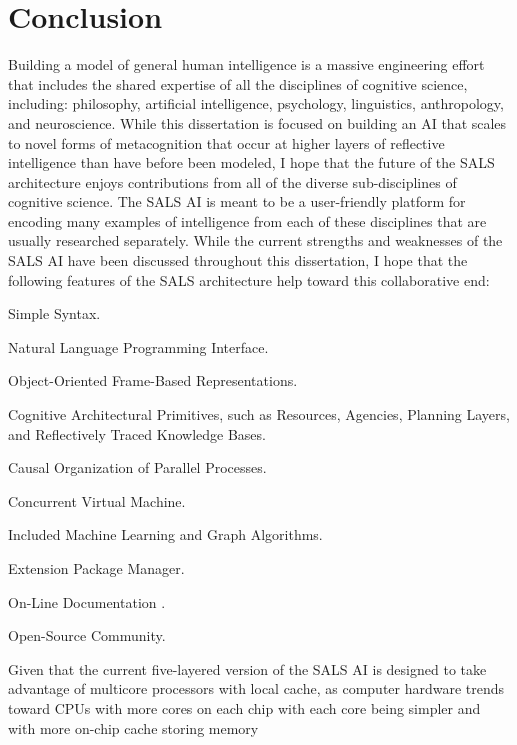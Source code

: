\chapter{Conclusion}
\label{chapter:conclusion}

Building a model of general human intelligence is a massive
engineering effort that includes the shared expertise of all the
disciplines of cognitive science, including: philosophy, artificial
intelligence, psychology, linguistics, anthropology, and neuroscience.
While this dissertation is focused on building an AI that scales to
novel forms of metacognition that occur at higher layers of reflective
intelligence than have before been modeled, I hope that the future of
the SALS architecture enjoys contributions from all of the diverse
sub-disciplines of cognitive science.  The SALS AI is meant to be a
user-friendly platform for encoding many examples of intelligence from
each of these disciplines that are usually researched separately.
While the current strengths and weaknesses of the SALS AI have been
discussed throughout this dissertation, I hope that the following
features of the SALS architecture help toward this collaborative end:
\begin{packed_enumerate}
\item{Simple Syntax.}
\item{Natural Language Programming Interface.}
\item{Object-Oriented Frame-Based Representations.}
\item{Cognitive Architectural Primitives, such as Resources, Agencies,
  Planning Layers, and Reflectively Traced Knowledge Bases.}
\item{Causal Organization of Parallel Processes.}
\item{Concurrent Virtual Machine.}
\item{Included Machine Learning and Graph Algorithms.}
\item{Extension Package Manager.}
\item{On-Line Documentation \cite[]{morgan:2012}.}
\item{Open-Source Community.}
\end{packed_enumerate}
Given that the current five-layered version of the SALS AI is designed
to take advantage of multicore processors with local cache, as
computer hardware trends toward CPUs with more cores on each chip with
each core being simpler and with more on-chip cache storing memory
